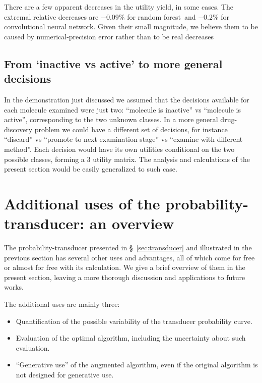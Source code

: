 \documentclass[a4paper,12pt,%
onecolumn,oneside,article,%
british%
]{memoir}
\renewcommand*{\|}[1][]{\nonscript\:#1\vert\nonscript\:\mathopen{}}
\newcommand*{\sect}{\S}%
\newcommand*{\RF}{random forest}
\newcommand*{\CNN}{convolutional neural network}
\begin{document}
There are a few apparent decreases in the utility yield, in some cases. The extremal relative decreases are $-0.09\%$ for \RF\ and  $-0.2\%$ for \CNN. Given their small magnitude, we believe them to be caused by numerical-precision error rather than to be real decreases %

\subsection{From `inactive vs active' to more general decisions}
\label{sec:gen_decision}

In the demonstration just discussed we assumed that the decisions available for each molecule examined were just two: \enquote{molecule is inactive} vs \enquote{molecule is active}, corresponding to the two unknown classes. In a more general drug-discovery problem we could have a different set of decisions, for instance \enquote{discard} vs \enquote{promote to next examination stage} vs \enquote{examine with different method}. Each decision would have its own utilities conditional on the two possible classes, forming a 3 utility matrix. The analysis and calculations of the present section would be easily generalized to such case.


\section{Additional uses of the probability-transducer: an overview}
\label{sec:overview_other_uses}

The probability-transducer presented in \sect~\ref{sec:transducer} and illustrated in the previous section has several other uses and advantages, all of which come for free or almost for free with its calculation. We give a brief overview of them in the present section, leaving a more thorough discussion and applications to future works.

The additional uses are mainly three:
\begin{itemize}
\item Quantification of the possible variability of the transducer probability curve.
\item Evaluation of the optimal algorithm, including the uncertainty about such evaluation.
\item \enquote{Generative use} of the augmented algorithm, even if the original algorithm is not designed for generative use.
\end{itemize}
\end{document}
